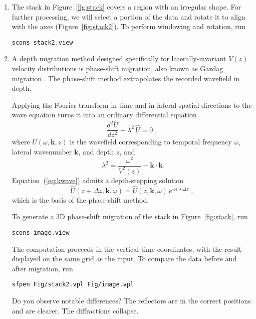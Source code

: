 \begin{enumerate}

\item The stack in Figure~\ref{fig:stack} covers a region with an irregular shape. For further processing, we will select a portion of the data and rotate it to align with the axes (Figure~\ref{fig:stack2}). To perform windowing and rotation, run
\begin{verbatim}
scons stack2.view
\end{verbatim}

\item A depth migration method designed specifically for laterally-invariant $V(z)$ velocity distributions is phase-shift migration, also known as Gazdag migration \cite[]{GEO43-07-13421351}. The phase-shift method extrapolates the recorded wavefield in depth.

Applying the Fourier transform in time and in lateral spatial directions to the wave equation turns it into an
ordinary differential equation
\begin{equation}
\label{eq:kwave}
\frac{d^2 \hat{U}}{d z^2} + \lambda^2\,\hat{U} = 0\;,
\end{equation}
where $U(\omega,\mathbf{k},z)$ is the wavefield corresponding to temporal frequency $\omega$, lateral wavenumber $\mathbf{k}$, and depth $z$, and
\[
\lambda^2 = \frac{\omega^2}{V^2(z)} - \mathbf{k} \cdot
\mathbf{k}
\]
Equation~(\ref{eq:kwave}) admits a depth-stepping solution
\begin{equation}
\label{eq:ps}
\hat{U}(z+\Delta z,\mathbf{k},\omega) = \hat{U}(z,\mathbf{k},\omega)\,e^{\pm i\,\lambda\,\Delta z}\;,
\end{equation}
which is the basis of the phase-shift method.

To generate a 3D phase-shift migration of the stack in Figure~\ref{fig:stack}, run
\begin{verbatim}
scons image.view
\end{verbatim}
The computation proceeds in the vertical time coordinates, with the result displayed on the same grid as the input. To compare the data before and after migration, run
\begin{verbatim}
sfpen Fig/stack2.vpl Fig/image.vpl
\end{verbatim}
Do you observe notable differences? The reflectors are in the correct positions and are clearer. The diffractions collapse.  



\end{enumerate}
